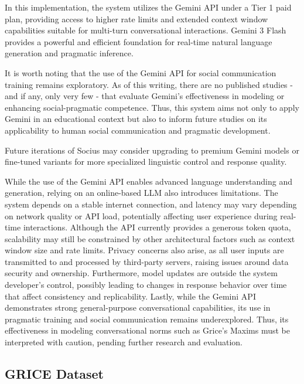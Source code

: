     In this implementation, the system utilizes the Gemini API under a Tier 1 paid plan, 
    providing access to higher rate limits and extended context window capabilities suitable 
    for multi-turn conversational interactions. Gemini 3 Flash provides a powerful and 
    efficient foundation for real-time natural language generation and pragmatic inference.

    It is worth noting that the use of the Gemini API for social communication training remains exploratory.
    As of this writing, there are no published studies - and if any, only very few - that evaluate Gemini's effectiveness
    in modeling or enhancing social-pragmatic competence. Thus, this system aims not only to apply Gemini
    in an educational context but also to inform future studies on its applicability to human social 
    communication and pragmatic development.

    Future iterations of Socius may consider upgrading to premium Gemini models or fine-tuned variants for
    more specialized linguistic control and response quality.

    While the use of the Gemini API enables advanced language understanding and generation, relying on an
    online-based LLM also introduces limitations. The system depends on a stable internet connection,
    and latency may vary depending on network quality or API load, potentially affecting user experience during
    real-time interactions. Although the API currently provides a generous token quota, scalability may still
    be constrained by other architectural factors such as context window size and rate limits. Privacy concerns
    also arise, as all user inputs are transmitted to and processed by third-party servers, raising issues
    around data security and ownership. Furthermore, model updates are outside the system developer's control,
    possibly leading to changes in response behavior over time that affect consistency and replicability.
    Lastly, while the Gemini API demonstrates strong general-purpose conversational capabilities, its use
    in pragmatic training and social communication remains underexplored. Thus, its effectiveness in
    modeling conversational norms such as Grice’s Maxims must be interpreted with caution, pending 
    further research and evaluation.

    \subsection{GRICE Dataset}

